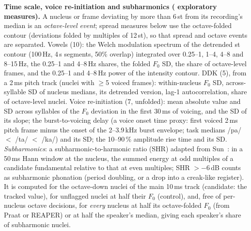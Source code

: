 \documentclass{article}
\begin{document}
\textbf{Time scale, voice re-initiation and subharmonics (\nExt{} exploratory measures).} A nucleus or frame deviating by more than 6\,st from its recording's median is an \emph{octave-level event}; spread measures below use the octave-folded contour (deviations folded by multiples of 12\,st), so that spread and octave events are separated. Vowels (10): the Welch modulation spectrum of the detrended st contour (100\,Hz, 4\,s segments, 50\% overlap) integrated over 0.25--1, 1--4, 4--8 and 8--15\,Hz, the 0.25--1 and 4--8\,Hz shares, the folded $F_0$ SD, the share of octave-level frames, and the 0.25--1 and 4--8\,Hz power of the intensity contour. DDK (5), from a 2\,ms pitch track (nuclei with $\geq$5 voiced frames): within-nucleus $F_0$ SD, across-syllable SD of nucleus medians, its detrended version, lag-1 autocorrelation, share of octave-level nuclei. Voice re-initiation (7, unfolded): mean absolute value and SD across syllables of the $F_0$ deviation in the first 30\,ms of voicing, and the SD of its slope; the burst-to-voicing delay (a voice onset time proxy: first voiced 2\,ms pitch frame minus the onset of the 2--3.9\,kHz burst envelope; task medians /pa/ $<$ /ta/ $<$ /ka/) and its SD; the 10--90\,\% amplitude rise time and its SD. \emph{Subharmonics}: a subharmonic-to-harmonic ratio (SHR) adapted from Sun~\cite{sun2002shr}: in a 50\,ms Hann window at the nucleus, the summed energy at odd multiples of a candidate fundamental relative to that at even multiples; SHR $> -6$\,dB counts as subharmonic phonation (period doubling, or a drop into a creak-like register). It is computed for the octave-down nuclei of the main 10\,ms track (candidate: the tracked value), for unflagged nuclei at half their $F_0$ (control), and, free of per-nucleus octave decisions, for \emph{every} nucleus at half its octave-folded $F_0$ (from Praat or REAPER) or at half the speaker's median, giving each speaker's share of subharmonic nuclei.
\end{document}
